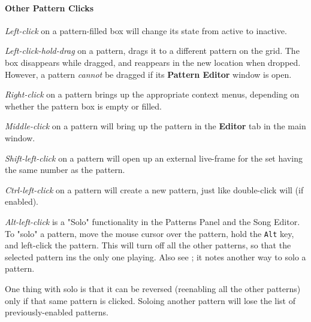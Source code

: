 \paragraph{Other Pattern Clicks}
\label{paragraph:patterns_pattern_clicks}

   \textsl{Left-click} on a pattern-filled box will change its state
   from active to inactive.

   \textsl{Left-click-hold-drag} on a pattern, drags it to a different
   pattern on the grid.
   The box disappears while dragged, and reappears in the new location when
   dropped.  However, a pattern \textsl{cannot} be dragged if its
   \textbf{Pattern Editor} window is open.

   \textsl{Right-click} on a pattern brings up the appropriate context menus,
   depending on whether the pattern box is empty or filled.

   \textsl{Middle-click} on a pattern will bring up the pattern
   in the \textbf{Editor}
   tab in the main window.

   \textsl{Shift-left-click} on a pattern will open up an external
   live-frame for the
   set having the same number as the pattern.

   \textsl{Ctrl-left-click} on a pattern will create a new pattern, just like
   double-click will (if enabled).

   \textsl{Alt-left-click}
   is a "Solo" functionality in the Patterns
   Panel and the Song Editor.  To "solo" a pattern, move the mouse cursor
   over the pattern, hold the \texttt{Alt} key, and left-click the pattern.
   This will turn off all the other patterns, so that the selected pattern ins
   the only one playing.
   Also see ; it notes another way to
   solo a pattern.

   One thing with solo is that it can be reversed (reenabling all
   the other patterns) only if that same pattern is clicked.
   Soloing another
   pattern will lose the list of previously-enabled patterns.

